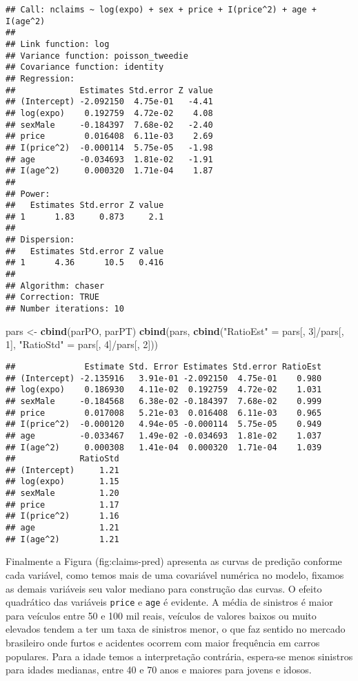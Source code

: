 \documentclass[9pt,a5paper,]{book}
\newenvironment{Shaded}{}{}
\newcommand{\KeywordTok}[1]{\textbf{{#1}}}
\newcommand{\DecValTok}[1]{{#1}}
\newcommand{\StringTok}[1]{{#1}}
\newcommand{\NormalTok}[1]{{#1}}
\renewenvironment{Shaded}{\color{inputcolor}}{}
\theoremstyle{definition}
\theoremstyle{definition}
\theoremstyle{remark}
\begin{document}
\begin{verbatim}
## Call: nclaims ~ log(expo) + sex + price + I(price^2) + age + I(age^2)
## 
## Link function: log
## Variance function: poisson_tweedie
## Covariance function: identity
## Regression:
##             Estimates Std.error Z value
## (Intercept) -2.092150  4.75e-01   -4.41
## log(expo)    0.192759  4.72e-02    4.08
## sexMale     -0.184397  7.68e-02   -2.40
## price        0.016408  6.11e-03    2.69
## I(price^2)  -0.000114  5.75e-05   -1.98
## age         -0.034693  1.81e-02   -1.91
## I(age^2)     0.000320  1.71e-04    1.87
## 
## Power:
##   Estimates Std.error Z value
## 1      1.83     0.873     2.1
## 
## Dispersion:
##   Estimates Std.error Z value
## 1      4.36      10.5   0.416
## 
## Algorithm: chaser
## Correction: TRUE
## Number iterations: 10
\end{verbatim}

\begin{Shaded}
\begin{Highlighting}[]
\NormalTok{pars <-}\StringTok{ }\KeywordTok{cbind}\NormalTok{(parPO, parPT)}
\KeywordTok{cbind}\NormalTok{(pars, }\KeywordTok{cbind}\NormalTok{(}\StringTok{"RatioEst"} \NormalTok{=}\StringTok{ }\NormalTok{pars[, }\DecValTok{3}\NormalTok{]/pars[, }\DecValTok{1}\NormalTok{],}
                  \StringTok{"RatioStd"} \NormalTok{=}\StringTok{ }\NormalTok{pars[, }\DecValTok{4}\NormalTok{]/pars[, }\DecValTok{2}\NormalTok{]))}
\end{Highlighting}
\end{Shaded}

\begin{verbatim}
##              Estimate Std. Error Estimates Std.error RatioEst
## (Intercept) -2.135916   3.91e-01 -2.092150  4.75e-01    0.980
## log(expo)    0.186930   4.11e-02  0.192759  4.72e-02    1.031
## sexMale     -0.184568   6.38e-02 -0.184397  7.68e-02    0.999
## price        0.017008   5.21e-03  0.016408  6.11e-03    0.965
## I(price^2)  -0.000120   4.94e-05 -0.000114  5.75e-05    0.949
## age         -0.033467   1.49e-02 -0.034693  1.81e-02    1.037
## I(age^2)     0.000308   1.41e-04  0.000320  1.71e-04    1.039
##             RatioStd
## (Intercept)     1.21
## log(expo)       1.15
## sexMale         1.20
## price           1.17
## I(price^2)      1.16
## age             1.21
## I(age^2)        1.21
\end{verbatim}

Finalmente a Figura (fig:claims-pred) apresenta as curvas de
predição conforme cada variável, como temos mais de uma covariável
numérica no modelo, fixamos as demais variáveis seu valor mediano para
construção das curvas. O efeito quadrático das variáveis \texttt{price}
e \texttt{age} é evidente. A média de sinistros é maior para veículos
entre 50 e 100 mil reais, veículos de valores baixos ou muito elevados
tendem a ter um taxa de sinistros menor, o que faz sentido no mercado
brasileiro onde furtos e acidentes ocorrem com maior frequência em
carros populares. Para a idade temos a interpretação contrária,
espera-se menos sinistros para idades medianas, entre 40 e 70 anos e
maiores para jovens e idosos.
\end{document}

